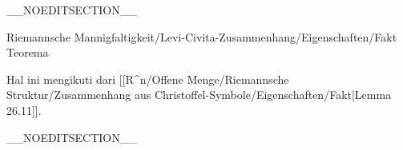 __NOEDITSECTION__

{Riemannsche Mannigfaltigkeit/Levi-Civita-Zusammenhang/Eigenschaften/Fakt}
{Teorema}
{}
{

\faktzusatz {}
\faktzusatz {}

}
{

Hal ini mengikuti dari
[[R^n/Offene Menge/Riemannsche Struktur/Zusammenhang aus Christoffel-Symbole/Eigenschaften/Fakt|Lemma 26.11]].

}

__NOEDITSECTION__

